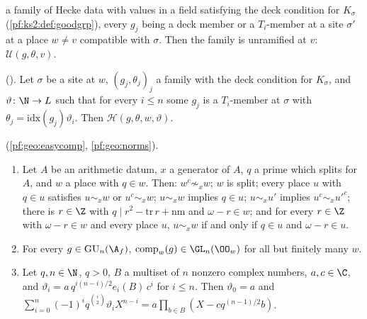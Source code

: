 \begin{description}[style=unboxed,leftmargin=1em,nosep]
  a family of Hecke data with values in a field satisfying the deck condition for $K_\sigma$ (\cref{pf:ks2:def:goodgrp}),
  every $g_j$ being a deck member or a $T_i$-member at a site $\sigma'$ at a place $w\ne v$ compatible with $\sigma$. Then the
  family is unramified at $v$: $\mathcal U(g,\theta,v)$.
\item[$\sfname{CongOf}$] (). Let $\sigma$ be a site at $w$, $(g_j,\theta_j)_j$
  a family with the deck condition for $K_\sigma$, and $\vartheta\colon\N\to L$ such that for every $i\le n$ some $g_j$ is a
  $T_i$-member at $\sigma$ with $\theta_j=\mathrm{idx}(g_j)\vartheta_i$. Then $\mathcal H(g,\theta,w,\vartheta)$.
\item[$\sfname{RootsAlg}$, $\sfname{SatCard}$] (\cref{pf:geo:easycomp}, \cref{pf:geo:norms}).
\end{description}

\begin{lemma}\label{pf:geo:easycomp}
\begin{enumerate}[label=(\alph*),nosep]
\item Let $A$ be an arithmetic datum, $x$ a generator of $A$, $q$ a prime which splits for $A$, and $w$ a place with $q\in w$.
  Then: $w^c\not\sim_xw$; $w$ is split; every place $u$ with $q\in u$ satisfies $u\sim_xw$ or $u^c\sim_xw$; $u\sim_xw$ implies
  $q\in u$; $u\sim_xu'$ implies $u^c\sim_xu'^c$; there is $r\in\Z$ with $q\mid r^2-\mathrm{tr}\,r+\mathrm{nm}$ and $\omega-r\in w$; and for every
  $r\in\Z$ with $\omega-r\in w$ and every place $u$, $u\sim_xw$ if and only if $q\in u$ and $\omega-r\in u$.
\item For every $g\in\geoGU_n(\A_f)$, $\mathrm{comp}_w(g)\in\GL_n(\OO_w)$ for all but finitely many $w$.
\item Let $q,n\in\N$, $q>0$, $B$ a multiset of $n$ nonzero complex numbers, $a,c\in\C$, and
  $\vartheta_i=a\,q^{i(n-i)/2}e_i(B)\,c^i$ for $i\le n$. Then $\vartheta_0=a$ and
  $\sum_{i=0}^n(-1)^iq^{\binom i2}\vartheta_iX^{n-i}=a\prod_{b\in B}(X-cq^{(n-1)/2}b)$.
\end{enumerate}
\end{lemma}

